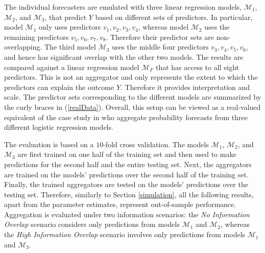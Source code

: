 \documentclass[11pt]{article}
\theoremstyle{definition}
\theoremstyle{definition}
\begin{document}
The individual forecasters are emulated with three linear regression models, $\mathcal{M}_1$, $\mathcal{M}_2$, and $\mathcal{M}_3$, that predict $Y$ based on different sets of predictors. In particular, model $\mathcal{M}_1$ only uses predictors $v_1, v_2, v_3, v_4$, whereas model $\mathcal{M}_2$ uses the remaining predictors $v_5, v_6, v_7, v_8$. Therefore their predictor sets are non-overlapping. The third model $\mathcal{M}_3$ uses the middle four predictors $v_3, v_4, v_5, v_6$, and hence has significant overlap with the other two models. The results are compared against a linear regression model $\mathcal{M}_F$ that has access to all eight predictors. This is not an aggregator and only represents the extent to which the predictors can explain the outcome $Y$. Therefore it provides interpretation and scale. The predictor sets corresponding to the different models are summarized by the curly braces in (\ref{realData}). Overall, this setup can be viewed as a real-valued equivalent of the case study in \cite{Ranjan08} who aggregate probability forecasts from three different logistic regression models. 

The evaluation is based on a $10$-fold cross validation. The models $\mathcal{M}_1$, $\mathcal{M}_2$, and $\mathcal{M}_3$ are first trained on one half of the training set and then used to make  predictions for the second half and the entire testing set. Next, the aggregators are  trained on the models' predictions over the second half of the training set. Finally, the trained aggregators are tested on the models' predictions over the testing set. Therefore, similarly to Section \ref{simulation}, all the following results, apart from the parameter estimates, represent out-of-sample performance. Aggregation is evaluated under two information scenarios: the \textit{No Information Overlap} scenario considers only predictions from models $\mathcal{M}_1$ and $\mathcal{M}_2$, whereas the \textit{High Information Overlap} scenario involves only predictions from models $\mathcal{M}_1$ and $\mathcal{M}_3$. 
\end{document}
